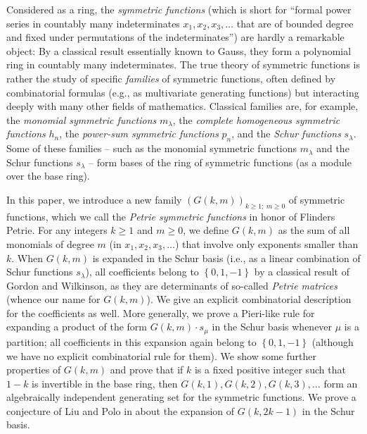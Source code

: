 \documentclass[numbers=enddot,12pt,final,onecolumn,notitlepage]{scrartcl}%
\theoremstyle{definition}
\begin{document}
Considered as a ring, the \textit{symmetric functions} (which is short for
\textquotedblleft formal power series in countably many indeterminates
$x_{1},x_{2},x_{3},\ldots$ that are of bounded degree and fixed under
permutations of the indeterminates\textquotedblright) are hardly a remarkable
object: By a classical result essentially known to Gauss, they form a
polynomial ring in countably many indeterminates. The true theory of symmetric
functions is rather the study of specific \textit{families} of symmetric
functions, often defined by combinatorial formulas (e.g., as multivariate
generating functions) but interacting deeply with many other fields of
mathematics. Classical families are, for example, the \textit{monomial
symmetric functions} $m_{\lambda}$, the \textit{complete homogeneous symmetric
functions }$h_{n}$, the \textit{power-sum symmetric functions} $p_{n}$, and
the \textit{Schur functions }$s_{\lambda}$. Some of these families -- such as
the monomial symmetric functions $m_{\lambda}$ and the Schur functions
$s_{\lambda}$ -- form bases of the ring of symmetric functions (as a module
over the base ring).

In this paper, we introduce a new family $\left(  G\left(  k,m\right)
\right)  _{k\geq1;\ m\geq0}$ of symmetric functions, which we call the
\textit{Petrie symmetric functions} in honor of Flinders Petrie. For any
integers $k\geq1$ and $m\geq0$, we define $G\left(  k,m\right)  $ as the sum
of all monomials of degree $m$ (in $x_{1},x_{2},x_{3},\ldots$) that involve
only exponents smaller than $k$. When $G\left(  k,m\right)  $ is expanded in
the Schur basis (i.e., as a linear combination of Schur functions $s_{\lambda
}$), all coefficients belong to $\left\{  0,1,-1\right\}  $ by a classical
result of Gordon and Wilkinson, as they are determinants of so-called
\textit{Petrie matrices} (whence our name for $G\left(  k,m\right)  $). We
give an explicit combinatorial description for the coefficients as well. More
generally, we prove a Pieri-like rule for expanding a product of the form
$G\left(  k,m\right)  \cdot s_{\mu}$ in the Schur basis whenever $\mu$ is a
partition; all coefficients in this expansion again belong to $\left\{
0,1,-1\right\}  $ (although we have no explicit combinatorial rule for them).
We show some further properties of $G\left(  k,m\right)  $ and prove that if
$k$ is a fixed positive integer such that $1-k$ is invertible in the base
ring, then $G\left(  k,1\right)  ,G\left(  k,2\right)  ,G\left(  k,3\right)
,\ldots$ form an algebraically independent generating set for the symmetric
functions. We prove a conjecture of Liu and Polo in \cite[Remark
1.4.5]{LiuPol19} about the expansion of $G\left(  k,2k-1\right)  $ in the
Schur basis.
\end{document}
